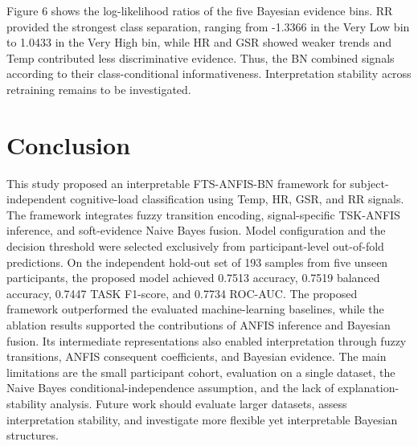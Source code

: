 \documentclass[runningheads]{llncs}
\begin{document}
Figure 6 shows the log-likelihood ratios of the five Bayesian evidence bins. RR provided the strongest class separation, ranging from -1.3366 in the Very Low bin to 1.0433 in the Very High bin, while HR and GSR showed weaker trends and Temp contributed less discriminative evidence. Thus, the BN combined signals according to their class-conditional informativeness. Interpretation stability across retraining remains to be investigated.

\section{Conclusion}

This study proposed an interpretable FTS-ANFIS-BN framework for subject-independent cognitive-load classification using Temp, HR, GSR, and RR signals. The framework integrates fuzzy transition encoding, signal-specific TSK-ANFIS inference, and soft-evidence Naive Bayes fusion. Model configuration and the decision threshold were selected exclusively from participant-level out-of-fold predictions. On the independent hold-out set of 193 samples from five unseen participants, the proposed model achieved 0.7513 accuracy, 0.7519 balanced accuracy, 0.7447 TASK F1-score, and 0.7734 ROC-AUC. The proposed framework outperformed the evaluated machine-learning baselines, while the ablation results supported the contributions of ANFIS inference and Bayesian fusion. Its intermediate representations also enabled interpretation through fuzzy transitions, ANFIS consequent coefficients, and Bayesian evidence. The main limitations are the small participant cohort, evaluation on a single dataset, the Naive Bayes conditional-independence assumption, and the lack of explanation-stability analysis. Future work should evaluate larger datasets, assess interpretation stability, and investigate more flexible yet interpretable Bayesian structures.
\end{document}
